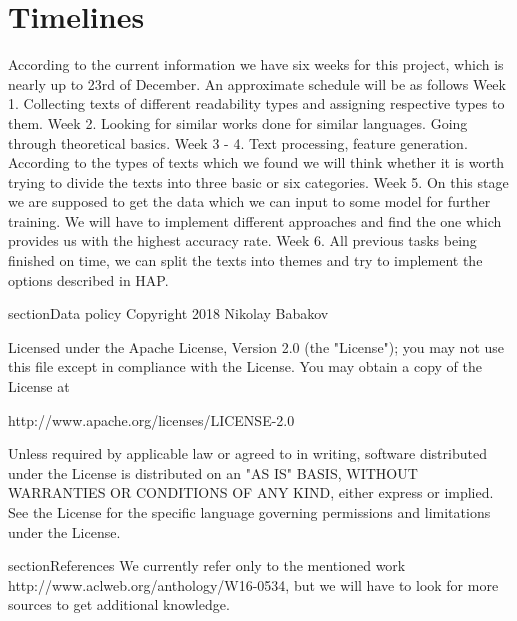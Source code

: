 \documentclass{article}
\begin{document}
\section{Timelines}
According to the current information we have six weeks for this project, which is nearly up to 23rd of December.
An approximate schedule will be as follows\newline
Week 1. Collecting texts of different readability types and assigning respective types to them.\newline
Week 2. Looking for similar works done for similar languages. Going through theoretical basics. \newline
Week 3 - 4. Text processing, feature generation. According to the types of texts which we found we will think whether it is worth trying to divide the texts into three basic or six categories.\newline
Week 5. On this stage we are supposed to get the data which we can input to some model for further training. We will have to implement different approaches and find the one which provides us with the highest accuracy rate.\newline
Week 6. All previous tasks being finished on time, we can split the texts into themes and try to implement the options described in HAP.

section{Data policy}
Copyright 2018 Nikolay Babakov

Licensed under the Apache License, Version 2.0 (the "License");
you may not use this file except in compliance with the License.
You may obtain a copy of the License at

http://www.apache.org/licenses/LICENSE-2.0

Unless required by applicable law or agreed to in writing, software
distributed under the License is distributed on an "AS IS" BASIS,
WITHOUT WARRANTIES OR CONDITIONS OF ANY KIND, either express or implied.
See the License for the specific language governing permissions and
limitations under the License. 

section{References}
We currently refer only to the mentioned work http://www.aclweb.org/anthology/W16-0534, but we will have to look for more sources to get additional knowledge. 
\end{document}

